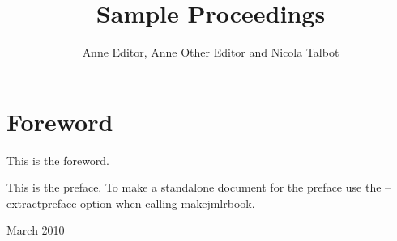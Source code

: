 \documentclass[wcp,pdfxa]{jmlrbook}
\title{Sample Proceedings}
\author[Anne Editor et al.]{Anne Editor, Anne Other Editor and Nicola Talbot}
\subtitle{\thejmlrworkshop}
\begin{document}
\maketitle

\frontmatter

\chapter{Foreword}

This is the foreword.

\begin{authorsignoff}
\end{authorsignoff}

\begin{preface}

This is the preface. To make a standalone document for the preface
use the --extractpreface option when calling makejmlrbook.

\begin{signoff}{March 2010}
\end{signoff}

\end{preface}

\tableofcontents

\mainmatter

\begin{jmlrpapers}
\end{jmlrpapers}
\end{document}

